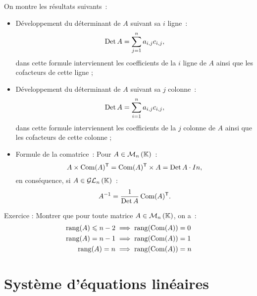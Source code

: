 On montre les résultats suivants~:
\begin{itemize}
	\item Développement du déterminant de $A$ suivant sa $i$\ieme{} ligne~:
	\begin{equation}
		\operatorname{Det} A = \sum_{j=1}^n a_{i,j} c_{i,j},
	\end{equation}
	dans cette formule interviennent les coefficients de la $i$\ieme{} ligne de $A$ ainsi que les cofacteurs de cette ligne ;
	\item Développement du déterminant de $A$ suivant sa $j$\ieme{} colonne~:
	\begin{equation}
		\operatorname{Det} A = \sum_{i=1}^n a_{i,j} c_{i,j},
	\end{equation}
	dans cette formule interviennent les coefficients de la $j$\ieme{} colonne de $A$ ainsi que les cofacteurs de cette colonne ;
	\item Formule de la comatrice~: Pour $A \in \mathcal{M}_{n}\left(\mathbb{K}\right)$~:
	\begin{equation}
		A \times \operatorname{Com}(A)^{\mathsf{T}} = \operatorname{Com}(A)^{\mathsf{T}} \times A= \operatorname{Det} A \cdot In,
	\end{equation}
	en conséquence, si $A \in \mathcal{GL}_{n}\left(\mathbb{K}\right)$~:
	\begin{equation}
		A^{-1} = \frac{1}{\operatorname{Det} A} \operatorname{Com}(A)^{\mathsf{T}}.
	\end{equation}
\end{itemize}
Exercice : Montrer que pour toute matrice $A \in \mathcal{M}_{n}\left(\mathbb{K}\right)$, on a~:
\begin{align}
	\operatorname{rang}(A) \leqslant n-2 &\implies \operatorname{rang}(\operatorname{Com}(A)) = 0\\	
	\operatorname{rang}(A) = n-1 &\implies \operatorname{rang}(\operatorname{Com}(A)) = 1\\
	\operatorname{rang}(A) = n &\implies \operatorname{rang}(\operatorname{Com}(A)) = n\\
\end{align}

\section{Système d'équations linéaires}
